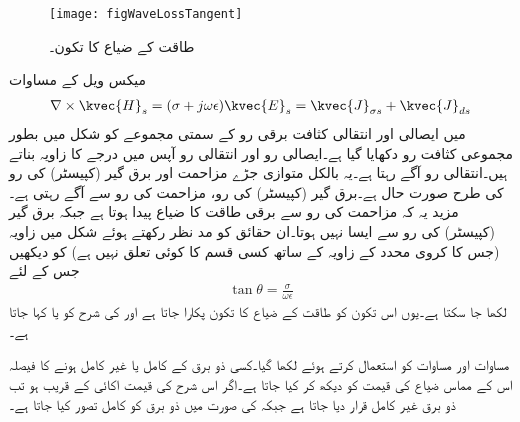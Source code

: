 \begin{figure}
\centering
\texttt{[image: figWaveLossTangent]}
\caption{طاقت کے ضیاع کا تکون۔}
\label{شکل_موج_ضیاع_کا_تکون}
\end{figure}

میکس ویل کے مساوات
\begin{align*}
\nabla \times \kvec{H}_s=(\sigma+j\omega \epsilon)\kvec{E}_s=\kvec{J}_{\sigma s}+\kvec{J}_{d s}
\end{align*}
میں ایصالی اور انتقالی کثافت برقی رو کے سمتی مجموعے کو شکل  میں بطور مجموعی کثافت رو  دکھایا گیا ہے۔ایصالی رو اور انتقالی رو آپس میں  درجے کا زاویہ بناتے ہیں۔انتقالی رو  آگے رہتا ہے۔یہ بالکل متوازی جڑے مزاحمت اور برق گیر (کپیسٹر)  کی رو کی طرح صورت حال ہے۔برق گیر (کپیسٹر)  کی رو، مزاحمت کی رو سے   آگے رہتی ہے۔مزید یہ کہ مزاحمت کی رو سے برقی طاقت  کا ضیاع پیدا ہوتا ہے جبکہ برق گیر (کپیسٹر)  کی رو سے ایسا نہیں ہوتا۔ان حقائق کو مد نظر رکھتے ہوئے  شکل  میں زاویہ  (جس کا کروی محدد کے زاویہ  کے ساتھ کسی قسم کا کوئی تعلق نہیں ہے) کو دیکھیں جس کے لئے
\begin{align}
\tan \theta=\frac{\sigma}{\omega \epsilon}
\end{align}
لکھا جا سکتا ہے۔یوں اس تکون کو طاقت کے ضیاع کا تکون پکارا جاتا ہے اور  کی شرح کو  یا کہا جاتا ہے۔

مساوات  اور مساوات  کو  استعمال کرتے ہوئے لکھا گیا۔کسی ذو برق کے کامل یا غیر کامل ہونے کا فیصلہ اس کے مماس ضیاع کی قیمت کو دیکھ کر کیا جاتا ہے۔اگر اس شرح کی قیمت اکائی کے قریب ہو تب ذو برق غیر کامل قرار دیا جاتا ہے جبکہ  کی صورت میں ذو برق کو کامل تصور کیا جاتا ہے۔

